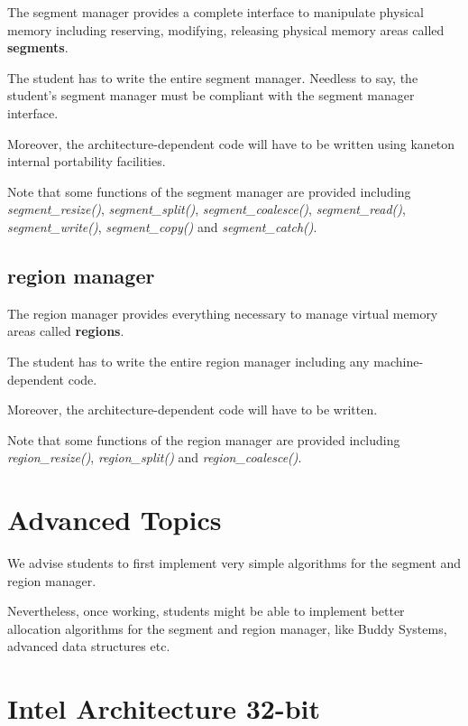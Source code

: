 The segment manager provides a complete interface to manipulate physical
memory including reserving, modifying, releasing physical memory areas
called \textbf{segments}.

The student has to write the entire segment manager. Needless to say, the
student's segment manager must be compliant with the segment manager
interface.

Moreover, the architecture-dependent code will have to be written using
kaneton internal portability facilities.

Note that some functions of the segment manager are provided including
\textit{segment\_resize()}, \textit{segment\_split()},
\textit{segment\_coalesce()}, \textit{segment\_read()},
\textit{segment\_write()}, \textit{segment\_copy()} and
\textit{segment\_catch()}.

%
%

\subsection{region manager}

The region manager provides everything necessary to manage virtual
memory areas called \textbf{regions}.

The student has to write the entire region manager including any
machine-dependent code.

Moreover, the architecture-dependent code will have to be written.

Note that some functions of the region manager are provided including
\textit{region\_resize()}, \textit{region\_split()} and
\textit{region\_coalesce()}.

%
%

\section{Advanced Topics}

We advise students to first implement very simple algorithms for the segment
and region manager.

Nevertheless, once working, students might be able to implement better
allocation algorithms for the segment and region manager, like Buddy Systems,
advanced data structures etc.

%
%

\section{Intel Architecture 32-bit}

